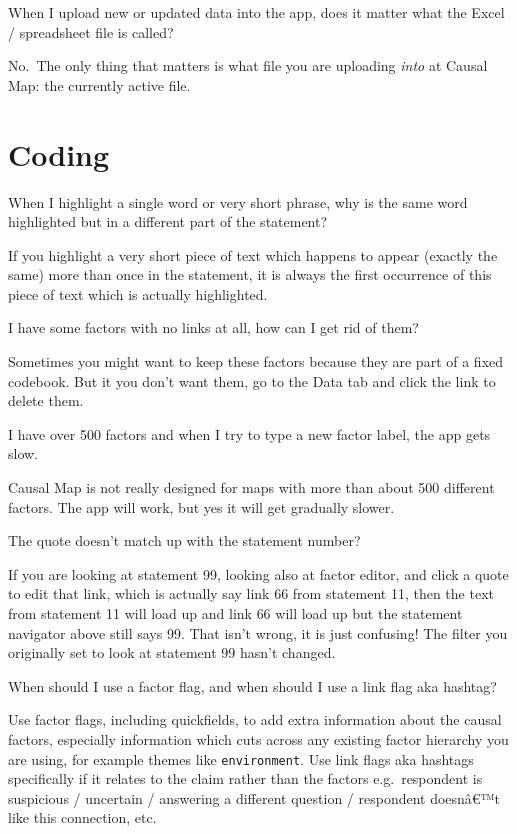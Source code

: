 \documentclass[
]{book}
\begin{document}
When I upload new or updated data into the app, does it matter what the Excel / spreadsheet file is called?

No.~The only thing that matters is what file you are uploading \emph{into} at Causal Map: the currently active file.

\hypertarget{coding}{%
\section{Coding}\label{coding}}

When I highlight a single word or very short phrase, why is the same word highlighted but in a different part of the statement?

If you highlight a very short piece of text which happens to appear (exactly the same) more than once in the statement, it is always the first occurrence of this piece of text which is actually highlighted.

I have some factors with no links at all, how can I get rid of them?

Sometimes you might want to keep these factors because they are part of a fixed codebook. But it you don't want them, go to the Data tab and click the link to delete them.

I have over 500 factors and when I try to type a new factor label, the app gets slow.

Causal Map is not really designed for maps with more than about 500 different factors. The app will work, but yes it will get gradually slower.

The quote doesn't match up with the statement number?

If you are looking at statement 99, looking also at factor editor, and click a quote to edit that link, which is actually say link 66 from statement 11, then the text from statement 11 will load up and link 66 will load up but the statement navigator above still says 99. That isn't wrong, it is just confusing! The filter you originally set to look at statement 99 hasn't changed.

When should I use a factor flag, and when should I use a link flag aka hashtag?

Use factor flags, including quickfields, to add extra information about the causal factors, especially information which cuts across any existing factor hierarchy you are using, for example themes like \texttt{environment}. Use link flags aka hashtags specifically if it relates to the claim rather than the factors e.g.~respondent is suspicious / uncertain / answering a different question / respondent doesnâ€™t like this connection, etc.
\end{document}
